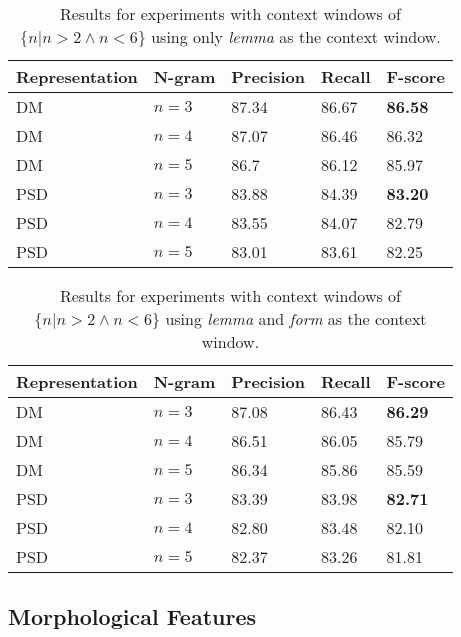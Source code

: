 \begin{table}
    \centering
    \smaller[0.2]
    \begin{tabular}{@{}lllll@{}}
        \toprule
        \textbf{Representation} & \textbf{N-gram} & \textbf{Precision} & \textbf{Recall} & \textbf{F-score} \\
        \midrule
        DM & $n=3$ & 87.34 & 86.67 & \textbf{86.58} \\
        DM & $n=4$  & 87.07 & 86.46 & 86.32 \\
        DM & $n=5$  & 86.7 & 86.12 & 85.97 \\
        \midrule
        PSD & $n=3$ & 83.88 & 84.39 & \textbf{83.20} \\
        PSD & $n=4$ & 83.55 & 84.07 & 82.79 \\
        PSD & $n=5$ & 83.01 & 83.61 & 82.25 \\
    
        \bottomrule
    \end{tabular}
    \caption{Results for experiments with context windows of ${\{n|n>2 \wedge n<6\}}$ using only \textit{lemma} as the context window.}
    \label{table:lemma_context}
\end{table}

\begin{table}
    \centering
    \smaller[0.2]
    \begin{tabular}{@{}lllll@{}}
        \toprule
        \textbf{Representation} & \textbf{N-gram} & \textbf{Precision} & \textbf{Recall} & \textbf{F-score} \\
        \midrule
        DM & $n=3$ &  87.08 & 86.43 & \textbf{86.29} \\
        DM & $n=4$  & 86.51 & 86.05 & 85.79 \\
        DM & $n=5$  & 86.34 & 85.86 & 85.59 \\
        \midrule
        PSD & $n=3$ & 83.39 & 83.98 & \textbf{82.71} \\
        PSD & $n=4$ & 82.80 & 83.48 & 82.10 \\
        PSD & $n=5$ & 82.37 & 83.26 & 81.81 \\
        \bottomrule
    \end{tabular}
    \caption{Results for experiments with context windows of ${\{n|n>2 \wedge n<6\}}$ using \textit{lemma} and \textit{form} as the context window.}
    \label{table:form_lemma_context}
\end{table}




\subsection{Morphological Features}
\label{results_morph}


